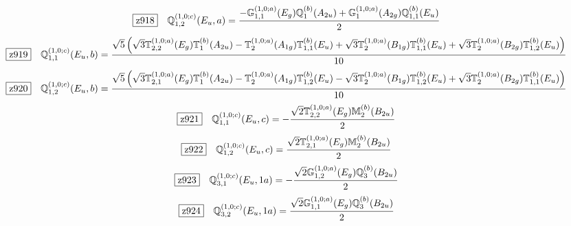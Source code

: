\documentclass[fleqn,10pt,landscape]{jsarticle}
\begin{document}
\begin{dmath*}
\hspace*{3mm}\fbox{z918}\quad \mathbb{Q}_{1,2}^{(1,0;c)}(E_{u},a)=\frac{- \mathbb{G}_{1,1}^{(1,0;a)}(E_{g}) \mathbb{Q}_{1}^{(b)}(A_{2u}) + \mathbb{G}_{1}^{(1,0;a)}(A_{2g}) \mathbb{Q}_{1,1}^{(b)}(E_{u})}{2}
\end{dmath*}
\begin{dmath*}
\hspace*{3mm}\fbox{z919}\quad \mathbb{Q}_{1,1}^{(1,0;c)}(E_{u},b)=\frac{\sqrt{5} \left(\sqrt{3} \mathbb{T}_{2,2}^{(1,0;a)}(E_{g}) \mathbb{T}_{1}^{(b)}(A_{2u}) - \mathbb{T}_{2}^{(1,0;a)}(A_{1g}) \mathbb{T}_{1,1}^{(b)}(E_{u}) + \sqrt{3} \mathbb{T}_{2}^{(1,0;a)}(B_{1g}) \mathbb{T}_{1,1}^{(b)}(E_{u}) + \sqrt{3} \mathbb{T}_{2}^{(1,0;a)}(B_{2g}) \mathbb{T}_{1,2}^{(b)}(E_{u})\right)}{10}
\end{dmath*}
\begin{dmath*}
\hspace*{3mm}\fbox{z920}\quad \mathbb{Q}_{1,2}^{(1,0;c)}(E_{u},b)=\frac{\sqrt{5} \left(\sqrt{3} \mathbb{T}_{2,1}^{(1,0;a)}(E_{g}) \mathbb{T}_{1}^{(b)}(A_{2u}) - \mathbb{T}_{2}^{(1,0;a)}(A_{1g}) \mathbb{T}_{1,2}^{(b)}(E_{u}) - \sqrt{3} \mathbb{T}_{2}^{(1,0;a)}(B_{1g}) \mathbb{T}_{1,2}^{(b)}(E_{u}) + \sqrt{3} \mathbb{T}_{2}^{(1,0;a)}(B_{2g}) \mathbb{T}_{1,1}^{(b)}(E_{u})\right)}{10}
\end{dmath*}
\begin{dmath*}
\hspace*{3mm}\fbox{z921}\quad \mathbb{Q}_{1,1}^{(1,0;c)}(E_{u},c)=- \frac{\sqrt{2} \mathbb{T}_{2,2}^{(1,0;a)}(E_{g}) \mathbb{M}_{2}^{(b)}(B_{2u})}{2}
\end{dmath*}
\begin{dmath*}
\hspace*{3mm}\fbox{z922}\quad \mathbb{Q}_{1,2}^{(1,0;c)}(E_{u},c)=\frac{\sqrt{2} \mathbb{T}_{2,1}^{(1,0;a)}(E_{g}) \mathbb{M}_{2}^{(b)}(B_{2u})}{2}
\end{dmath*}
\begin{dmath*}
\hspace*{3mm}\fbox{z923}\quad \mathbb{Q}_{3,1}^{(1,0;c)}(E_{u},1a)=- \frac{\sqrt{2} \mathbb{G}_{1,2}^{(1,0;a)}(E_{g}) \mathbb{Q}_{3}^{(b)}(B_{2u})}{2}
\end{dmath*}
\begin{dmath*}
\hspace*{3mm}\fbox{z924}\quad \mathbb{Q}_{3,2}^{(1,0;c)}(E_{u},1a)=\frac{\sqrt{2} \mathbb{G}_{1,1}^{(1,0;a)}(E_{g}) \mathbb{Q}_{3}^{(b)}(B_{2u})}{2}
\end{dmath*}
\end{document}
